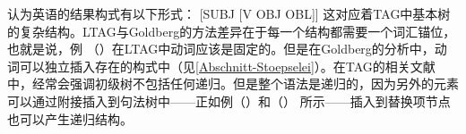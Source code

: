 \citet[]{Goldberg95a}认为英语的结果构式有以下形式：
\ea
{}[SUBJ [V OBJ OBL]] 
\z
这对应着TAG中基本树的复杂结构。LTAG与Goldberg的方法差异在于每一个结构都需要一个词汇锚位，也就是说，例 （）在LTAG中动词应该是固定的。但是在Goldberg的分析中，动词可以独立插入存在的构式中（见\ref{Abschnitt-Stoepselei}）。在TAG的相关文献中，经常会强调初级树不包括任何递归。但是整个语法是递归的，因为另外的元素可以通过附接插入到句法树中——正如例（）和（） 所示——插入到替换项节点也可以产生递归结构。



